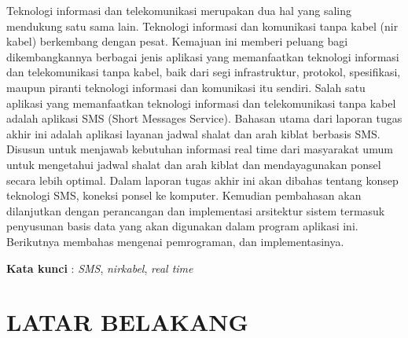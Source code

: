 \documentclass{jtetiproposalskripsi}
\begin{document}
\cover

\approvalpage


\begin{abstractind}
Teknologi informasi dan telekomunikasi merupakan dua hal yang saling mendukung satu sama lain. Teknologi informasi dan komunikasi tanpa kabel (nir kabel) berkembang dengan pesat. Kemajuan ini memberi peluang bagi dikembangkannya berbagai jenis aplikasi yang memanfaatkan teknologi informasi dan telekomunikasi tanpa kabel, baik dari segi infrastruktur, protokol, spesifikasi, maupun piranti teknologi informasi dan komunikasi itu sendiri.
Salah satu aplikasi yang memanfaatkan teknologi informasi dan telekomunikasi tanpa kabel adalah aplikasi SMS (Short Messages Service). Bahasan utama dari laporan tugas akhir ini adalah aplikasi layanan jadwal shalat dan arah kiblat berbasis SMS. Disusun untuk menjawab kebutuhan informasi real time dari masyarakat umum untuk mengetahui jadwal shalat dan arah kiblat dan mendayagunakan ponsel secara lebih optimal.
Dalam laporan tugas akhir ini akan dibahas tentang konsep teknologi SMS, koneksi ponsel ke komputer. Kemudian pembahasan akan dilanjutkan dengan perancangan dan implementasi arsitektur sistem termasuk penyusunan basis data yang akan digunakan dalam program aplikasi ini. Berikutnya membahas mengenai pemrograman, dan implementasinya.




\bigskip
\textbf{Kata kunci} : \emph{SMS}, \emph{nirkabel}, \emph{real time}
\end{abstractind}

\tableofcontents
{}
\clearpage{}\setcounter{page}{1}

\chapter{LATAR BELAKANG}
\end{document}
